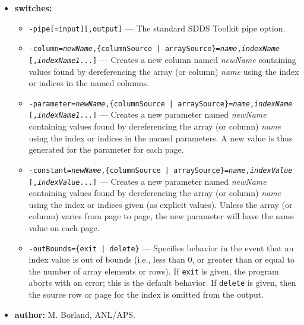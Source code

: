 \begin{itemize}
\item {\bf switches:} 
    \begin{itemize} 
   \item {\tt -pipe[=input][,output]} --- The standard SDDS Toolkit pipe option. 
    \item {\tt -column={\em newName},\{columnSource | arraySource\}={\em name},{\em indexName}} \\
        {\tt [,{\em indexName1}...]}
    --- Creates a new column named {\em newName} containing values 
    found by dereferencing the array (or column) {\em name} 
    using the index or indices in the named columns. 
    \item {\tt -parameter={\em newName},\{columnSource | arraySource\}={\em name},{\em indexName}}\\
         {\tt [,{\em indexName1}...]}
    --- Creates a new parameter named {\em newName} containing values 
    found by dereferencing the array (or column) {\em name} 
    using the index or indices in the named parameters.  A new value 
    is thus generated for the parameter for each page. 
    \item {\tt -constant={\em newName},\{columnSource | arraySource\}={\em name},{\em indexValue}}\\
         {\tt [,{\em indexValue}...]}  
    --- Creates a new parameter named {\em newName} containing values 
    found by dereferencing the array (or column) {\em name} using 
    the index or indices given (as explicit values).  Unless the array (or 
    column) varies from page to page, the new parameter will have the 
    same value on each page. 
    \item {\tt -outBounds=\{exit | delete\}} --- Specifies behavior in the event
        that an index value is out of bounds (i.e., less than 0, or greater than
        or equal to the number of array elements or rows).  If {\tt exit} is given,
        the program aborts with an error; this is the default behavior.
        If {\tt delete} is given, then the source row or page for the index
        is omitted from the output.
    \end{itemize} 
\item {\bf author:} M. Borland, ANL/APS. 
\end{itemize} 
